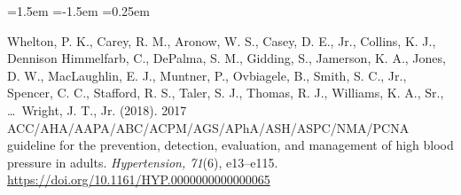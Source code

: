 \documentclass[11pt,a4paper]{article}
\begin{document}
\begin{list}{}{\leftmargin=1.5em \itemindent=-1.5em \itemsep=0.25em \parsep=0pt}
\item Whelton, P. K., Carey, R. M., Aronow, W. S., Casey, D. E., Jr., Collins, K. J., Dennison Himmelfarb, C., DePalma, S. M., Gidding, S., Jamerson, K. A., Jones, D. W., MacLaughlin, E. J., Muntner, P., Ovbiagele, B., Smith, S. C., Jr., Spencer, C. C., Stafford, R. S., Taler, S. J., Thomas, R. J., Williams, K. A., Sr., \dots\ Wright, J. T., Jr. (2018). 2017 ACC/AHA/AAPA/ABC/ACPM/AGS/APhA/ASH/ASPC/NMA/PCNA guideline for the prevention, detection, evaluation, and management of high blood pressure in adults. \textit{Hypertension, 71}(6), e13--e115. \url{https://doi.org/10.1161/HYP.0000000000000065}
\end{list}
\end{document}
